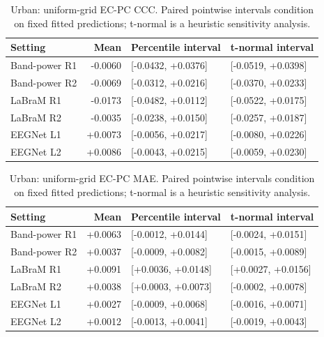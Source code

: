 \begin{table}[htbp]\centering\small
\caption{Urban: uniform-grid EC-PC CCC. Paired pointwise intervals condition on fixed fitted predictions; t-normal is a heuristic sensitivity analysis.}
\begin{tabular}{@{}lrll@{}}\toprule
Setting & Mean & Percentile interval & t-normal interval \\
\midrule
Band-power R1 & -0.0060 & [-0.0432, +0.0376] & [-0.0519, +0.0398] \\
Band-power R2 & -0.0069 & [-0.0312, +0.0216] & [-0.0370, +0.0233] \\
LaBraM R1 & -0.0173 & [-0.0482, +0.0112] & [-0.0522, +0.0175] \\
LaBraM R2 & -0.0035 & [-0.0238, +0.0150] & [-0.0257, +0.0187] \\
EEGNet L1 & +0.0073 & [-0.0056, +0.0217] & [-0.0080, +0.0226] \\
EEGNet L2 & +0.0086 & [-0.0043, +0.0215] & [-0.0059, +0.0230] \\
\bottomrule\end{tabular}\end{table}
\begin{table}[htbp]\centering\small
\caption{Urban: uniform-grid EC-PC MAE. Paired pointwise intervals condition on fixed fitted predictions; t-normal is a heuristic sensitivity analysis.}
\begin{tabular}{@{}lrll@{}}\toprule
Setting & Mean & Percentile interval & t-normal interval \\
\midrule
Band-power R1 & +0.0063 & [-0.0012, +0.0144] & [-0.0024, +0.0151] \\
Band-power R2 & +0.0037 & [-0.0009, +0.0082] & [-0.0015, +0.0089] \\
LaBraM R1 & +0.0091 & [+0.0036, +0.0148] & [+0.0027, +0.0156] \\
LaBraM R2 & +0.0038 & [+0.0003, +0.0073] & [-0.0002, +0.0078] \\
EEGNet L1 & +0.0027 & [-0.0009, +0.0068] & [-0.0016, +0.0071] \\
EEGNet L2 & +0.0012 & [-0.0013, +0.0041] & [-0.0019, +0.0043] \\
\bottomrule\end{tabular}\end{table}
